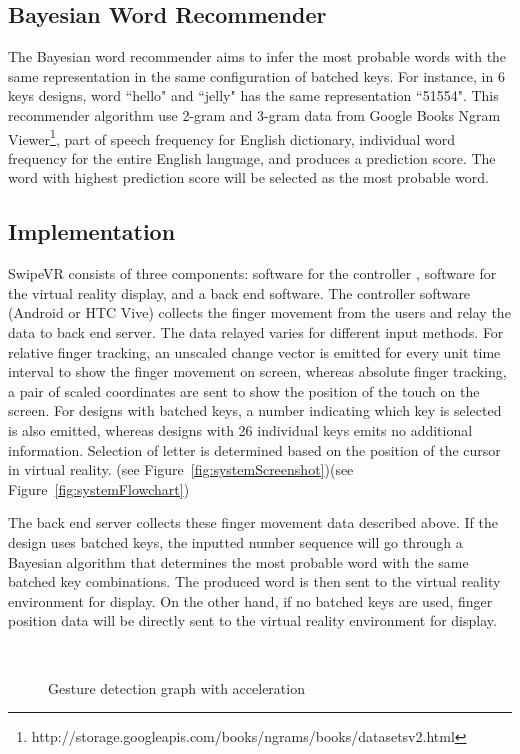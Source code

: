 \documentclass{sigchi}
\begin{document}
\subsection{Bayesian Word Recommender}
The Bayesian word recommender aims to infer the most probable words with the same representation in the same configuration of batched keys.
For instance, in 6 keys designs, word ``hello" and ``jelly" has the same representation ``51554".
This recommender algorithm use 2-gram and 3-gram data from Google Books Ngram Viewer\footnote{http://storage.googleapis.com/books/ngrams/books/datasetsv2.html}, part of speech frequency for English dictionary, individual word frequency for the entire English language, and produces a prediction score.
The word with highest prediction score will be selected as the most probable word.

\subsection{Implementation}
SwipeVR consists of three components: software for the controller , software for the virtual reality display, and a back end software.
The controller software (Android or HTC Vive) collects the finger movement from the users and relay the data to back end server.
The data relayed varies for different input methods.
For relative finger tracking, an unscaled change vector is emitted for every unit time interval to show the finger movement on screen, whereas absolute finger tracking, a pair of scaled coordinates are sent to show the position of the touch on the screen.
For designs with batched keys, a number indicating which key is selected is also emitted, whereas designs with 26 individual keys emits no additional information.
Selection of letter is determined based on the position of the cursor in virtual reality. (see Figure~\ref{fig:systemScreenshot})(see Figure~\ref{fig:systemFlowchart})

The back end server collects these finger movement data described above.
If the design uses batched keys, the inputted number sequence will go through a Bayesian algorithm that determines the most probable word with the same batched key combinations. The produced word is then sent to the virtual reality environment for display.
On the other hand, if no batched keys are used, finger position data will be directly sent to the virtual reality environment for display.



\begin{figure}
  \centering


	\caption{Gesture detection graph with acceleration}~\label{fig:acceleration}
\end{figure}
\end{document}
